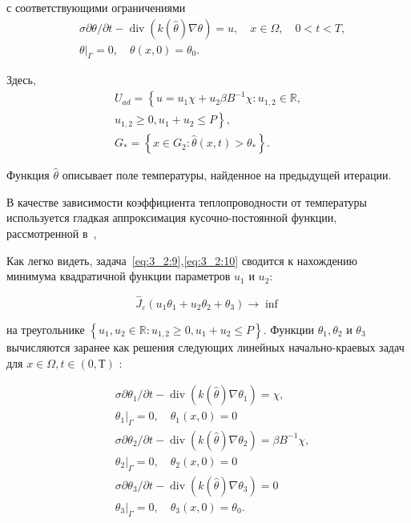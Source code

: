 с соответствующими ограничениями
\begin{equation}
    \label{eq:3_2:10}
    \begin{aligned}
        &\sigma \partial \theta / \partial t-\operatorname{div}(k(\widehat{\theta})
        \nabla \theta)=u, \quad x \in \Omega, \quad 0<t<T, \\
        &\left.\theta\right|_{\Gamma}=0, \quad \theta(x, 0)=\theta_{0}.
    \end{aligned}
\end{equation}

Здесь,
\[
    \begin{gathered}
        U_{a d}=\left\{u=u_{1} \chi+u_{2} \beta B^{-1} \chi: u_{1,2} \in \mathbb{R},\right. \\
        \left.u_{1,2} \geq 0, u_{1}+u_{2} \leq P\right\}, \\
        G_{*}=\left\{x \in G_{2}: \hat{\theta}(x, t)>\theta_{*}\right\}.
    \end{gathered}
\]

Функция $\widehat{\theta}$ описывает поле температуры,
найденное на предыдущей итерации.

В качестве зависимости коэффициента теплопроводности от температуры используется
гладкая аппроксимация кусочно-постоянной функции, рассмотренной
в~\cite{Opticalthermal_vanRuijven2014, Some_Poluektova2014, Endovenous_Malskat2014},

Как легко видеть, задача~\eqref{eq:3_2:9},\eqref{eq:3_2:10} сводится к
нахождению минимума квадратичной функции параметров $u_{1}$ и $u_{2}$:

\[
    \widehat{J}_{\varepsilon}\left(u_{1} \theta_{1}+u_{2} \theta_{2}+\theta_{3}\right) \rightarrow \inf
\]

на треугольнике  $\left\{u_{1}, u_{2} \in \mathbb{R}: u_{1,2} \geq 0, u_{1}+u_{2} \leq P\right\}$.
Функции $\theta_{1}, \theta_{2}$ и $\theta_{3}$ вычисляются заранее как решения следующих линейных
начально-краевых задач для $x \in \Omega, t \in(0, Т)$ :


\[
    \begin{aligned}
        &\sigma \partial \theta_{1} / \partial t-\operatorname{div}\left(k(\widehat{\theta})
        \nabla \theta_{1}\right)=\chi, \\
        &\left.\theta_{1}\right|_{\Gamma}=0, \quad \theta_{1}(x, 0)=0 \\
        &\sigma \partial \theta_{2} / \partial t-\operatorname{div}\left(k(\widehat{\theta})
        \nabla \theta_{2}\right)=\beta B^{-1} \chi, \\
        &\left.\theta_{2}\right|_{\Gamma}=0, \quad \theta_{2}(x, 0)=0 \\
        &\sigma \partial \theta_{3} / \partial t-\operatorname{div}\left(k(\widehat{\theta})
        \nabla \theta_{3}\right)=0 \\
        &\left.\theta_{3}\right|_{\Gamma}=0, \quad \theta_{3}(x, 0)=\theta_{0}.
    \end{aligned}
\]

